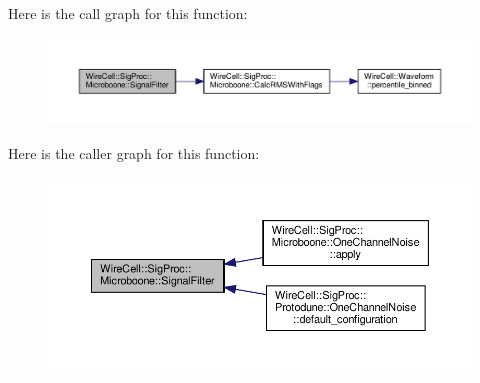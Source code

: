Here is the call graph for this function\+:
\nopagebreak
\begin{figure}[H]
\begin{center}
\leavevmode
\includegraphics[width=350pt]{namespace_wire_cell_1_1_sig_proc_1_1_microboone_a09348aad9dc69ef1d18d6145b03547ee_cgraph}
\end{center}
\end{figure}
Here is the caller graph for this function\+:
\nopagebreak
\begin{figure}[H]
\begin{center}
\leavevmode
\includegraphics[width=350pt]{namespace_wire_cell_1_1_sig_proc_1_1_microboone_a09348aad9dc69ef1d18d6145b03547ee_icgraph}
\end{center}
\end{figure}
\mbox{\label{namespace_wire_cell_1_1_sig_proc_1_1_microboone_a3502d22dc7280eeea95f3a2f2d52891c}} 
